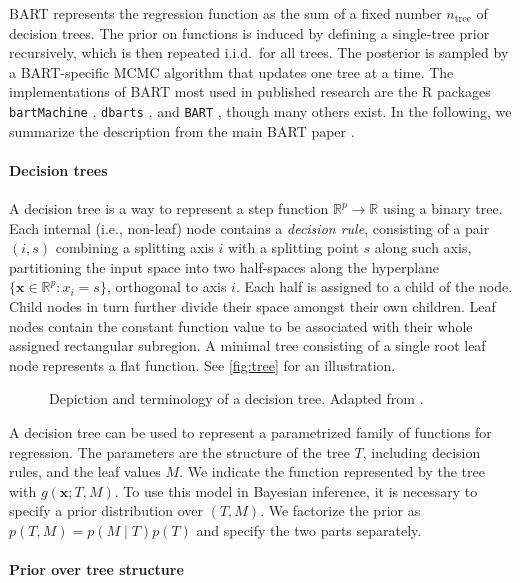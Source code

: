 \documentclass{article}
\begin{document}
BART represents the regression function as the sum of a fixed number
$n_\text{tree}$ of decision trees. The prior on functions is induced by
defining a single-tree prior recursively, which is then repeated i.i.d.\ for
all trees. The posterior is sampled by a BART-specific MCMC algorithm that
updates one tree at a time. The implementations of BART most used in published research are the R
packages \texttt{bartMachine} \citep{kapelner2016,kapelner2023},
\texttt{dbarts} \citep{dorie2024}, and \texttt{BART}
\citep{sparapani2021,mcculloch2024}, though many others exist. In the
following, we summarize the description from the main BART paper
\citep{chipman2010}.

\paragraph{Decision trees}

A decision tree is a way to represent a step function $\mathbb R^p \to \mathbb R$
using a binary tree. Each internal (i.e., non-leaf) node contains a \emph{decision rule}, consisting of a
pair $(i, s)$ combining a splitting axis $i$ with a splitting point $s$ along such axis,
partitioning the input space into two half-spaces along the hyperplane $\{\mathbf x \in \mathbb
	R^p: x_i = s\}$, orthogonal to axis $i$. Each half is assigned to a child of the node.
Child nodes in turn further divide their space amongst their own children. Leaf nodes
contain the constant function value to be associated with their whole assigned rectangular
subregion. A minimal tree consisting of a single root leaf node represents a flat
function. See \autoref{fig:tree} for an illustration.

\begin{figure}
	\centering
	
        \caption{\label{fig:tree} Depiction and terminology of a decision tree. Adapted from
                \citet[fig.~1]{hill2020}.}
\end{figure}

A decision tree can be used to represent a parametrized family of functions for
regression. The parameters are the structure of the tree $T$, including decision
rules, and the leaf values $M$. We indicate the function represented by the tree with
$g(\mathbf x;T,M)$. To use this model in Bayesian inference, it is necessary to specify a
prior distribution over $(T,M)$. We factorize the prior as $p(T,M) = p(M\mid T) p(T)$ and
specify the two parts separately.

\paragraph{Prior over tree structure}
\end{document}
